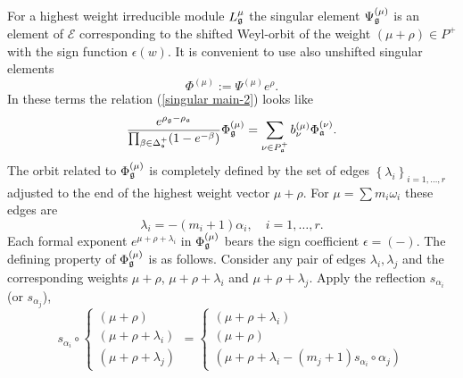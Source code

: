 For a highest weight irreducible module $L_{\frak{g}}^{\mu }$ the singular
element $\Psi _{\frak{g}}^{\left( \mu \right) }$ is an element of $\mathcal{E%
}$ corresponding to the shifted Weyl-orbit of the weight $\left( \mu +\rho
\right) \in P^{+}$ with the sign function $\epsilon \left( w\right) $. It is
convenient to use also unshifted singular elements
\begin{equation}
\Phi ^{\left( \mu \right) }:=\Psi ^{\left( \mu \right) }e^{\rho }.
\label{definition Phi}
\end{equation}
In these terms the relation (\ref{singular main-2}) looks like
\begin{equation}
\frac{e^{\rho _{\frak{g}}-\rho _{\frak{a}}}}{\prod_{\beta \in \Delta _{\frak{%
s}}^{+}}(1-e^{-\beta })}\Phi _{\frak{g}}^{\left( \mu \right) }=\sum_{\nu \in
P_{\frak{a}}^{+}}b_{\nu }^{(\mu )}\Phi _{\frak{a}}^{\left( \nu \right) }.
\label{singular main-3}
\end{equation}
The orbit related to $\Phi _{\frak{g}}^{\left( \mu \right) }$ is completely
defined by the set of edges $\left\{ \lambda _{i}\right\} _{i=1,\dots ,r}$
adjusted to the end of the highest weight vector $\mu +\rho $. For $\mu
=\sum m_{i}\omega _{i}$ these edges are
\begin{equation}
\lambda _{i}=-\left( m_{i}+1\right) \alpha _{i},\quad i=1,\dots ,r.
\label{edge}
\end{equation}
Each formal exponent $e^{\mu +\rho +\lambda _{i}}$ in $\Phi _{\frak{g}%
}^{\left( \mu \right) }$ bears the sign coefficient $\epsilon =(-)$. The
defining property of $\Phi _{\frak{g}}^{\left( \mu \right) }$ is as follows.
Consider any pair of edges $\lambda _{i},\lambda _{j}$ and the corresponding
weights $\mu +\rho $, $\mu +\rho +\lambda _{i}$ and $\mu +\rho +\lambda _{j}$. 
Apply the reflection $s_{\alpha _{i}}$ (or $s_{\alpha _{j}}$),
\begin{equation}
s_{\alpha _{i}}\circ \left\{
\begin{array}{l}
\left( \mu +\rho \right)  \\
\left( \mu +\rho +\lambda _{i}\right)  \\
\left( \mu +\rho +\lambda _{j}\right)
\end{array}
\right. =\left\{
\begin{array}{l}
\left( \mu +\rho +\lambda _{i}\right)  \\
\left( \mu +\rho \right)  \\
\left( \mu +\rho +\lambda _{i}-(m_{j}+1)s_{\alpha _{i}}\circ \alpha
_{j}\right)
\end{array}
\right.   \label{reflected triple}
\end{equation}

